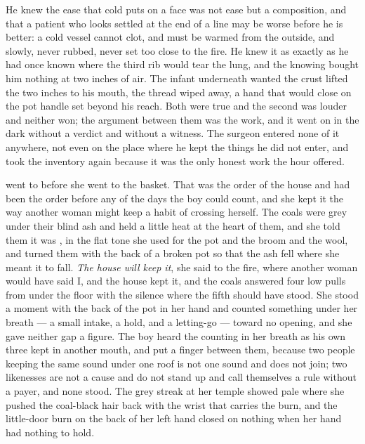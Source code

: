 He knew the ease that cold puts on a face was not ease but a composition, and that a patient who looks settled at the end of a line may be worse before he is better: a cold vessel cannot clot, and must be warmed from the outside, and slowly, never rubbed, never set too close to the fire. He knew it as exactly as he had once known where the third rib would tear the lung, and the knowing bought him nothing at two inches of air. The infant underneath wanted the crust lifted the two inches to his mouth, the thread wiped away, a hand that would close on the pot handle set beyond his reach. Both were true and the second was louder and neither won; the argument between them was the work, and it went on in the dark without a verdict and without a witness. The surgeon entered none of it anywhere, not even on the place where he kept the things he did not enter, and took the inventory again because it was the only honest work the hour offered.

\scenebreak

 went to  before she went to the basket. That was the order of the house and had been the order before any of the days the boy could count, and she kept it the way another woman might keep a habit of crossing herself. The coals were grey under their blind ash and held a little heat at the heart of them, and she told them it was , in the flat tone she used for the pot and the broom and the wool, and turned them with the back of a broken pot so that the ash fell where she meant it to fall. \emph{The house will keep it}, she said to the fire, where another woman would have said I, and the house kept it, and the coals answered four low pulls from under the floor with the silence where the fifth should have stood. She stood a moment with the back of the pot in her hand and counted something under her breath --- a small intake, a hold, and a letting-go --- toward no opening, and she gave neither gap a figure. The boy heard the counting in her breath as his own three kept in another mouth, and put a finger between them, because two people keeping the same sound under one roof is not one sound and does not join; two likenesses are not a cause and do not stand up and call themselves a rule without a payer, and none stood. The grey streak at her temple showed pale where she pushed the coal-black hair back with the wrist that carries the burn, and the little-door burn on the back of her left hand closed on nothing when her hand had nothing to hold.

